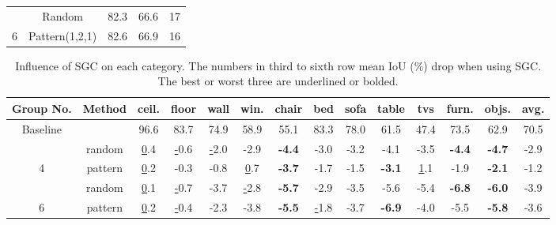 \documentclass[runningheads]{llncs}
\begin{document}
\begin{table}[t]
{\begin{tabular}{c|c|c|c|l|cl}
                                 & Random                        & 82.3                                        & \multicolumn{2}{c|}{66.6}                                                 & \multicolumn{2}{c}{17}                             \\
\multirow{-2}{*}{6}              & Pattern(1,2,1)                & 82.6                                        & \multicolumn{2}{c|}{66.9}                                                 & \multicolumn{2}{c}{16}                             \\ \hline
\end{tabular}}
\end{table}

\begin{table}[t]
\centering
\caption{
Influence of SGC on each category. The numbers in third to sixth row mean IoU (\%) drop when using SGC. The best or worst three are underlined or bolded.}
\label{tab:drop}
\resizebox{\textwidth}{!}
{\begin{tabular}{c|c|cccccccccccc}
\hline
{Group No.}               & {Method}   & {  ceil.}     & {floor}      & { wall}       & { win.}       & { chair}         & { bed}        & { sofa} & { table}         & { tvs}       & { furn.}         & { objs.}         & { avg.} \\ \hline
{ Baseline}            & { }        & { 96.6}      & { 83.7}       & { 74.9}       & { 58.9}       & { 55.1}          & { 83.3}       & { 78.0} & { 61.5}          & { 47.4}      & { 73.5}          & { 62.9}          & { 70.5} \\ \hline
{ }                    & { random}  & { {\ul 0.4}} & { {\ul -0.6}} & { {\ul -2.0}} & { -2.9}       & { \textbf{-4.4}} & { -3.0}       & { -3.2} & { -4.1}          & { -3.5}      & { \textbf{-4.4}} & { \textbf{-4.7}} & { -2.9} \\ \cline{2-14}
\multirow{-2}{*}{{ 4}} & { pattern} & { {\ul 0.2}} & { -0.3}       & { -0.8}       & { {\ul 0.7}}  & { \textbf{-3.7}} & { -1.7}       & { -1.5} & { \textbf{-3.1}} & { {\ul 1.1}} & { -1.9}          & { \textbf{-2.1}} & { -1.2} \\ \hline
{ }                    & { random}  & { {\ul 0.1}} & { {\ul -0.7}} & { -3.7}       & { {\ul -2.8}} & { \textbf{-5.7}} & { -2.9}       & { -3.5} & { -5.6}          & { -5.4}      & { \textbf{-6.8}} & { \textbf{-6.0}} & { -3.9} \\ \cline{2-14}
\multirow{-2}{*}{{ 6}} & { pattern} & { {\ul 0.2}} & { {\ul -0.4}} & { -2.3}       & { -3.8}       & { \textbf{-5.5}} & { {\ul -1.8}} & { -3.7} & { \textbf{-6.9}} & { -4.0}      & { -5.5}          & { \textbf{-5.8}} & { -3.6} \\ \hline
\end{tabular}}

\end{table}
\end{document}
